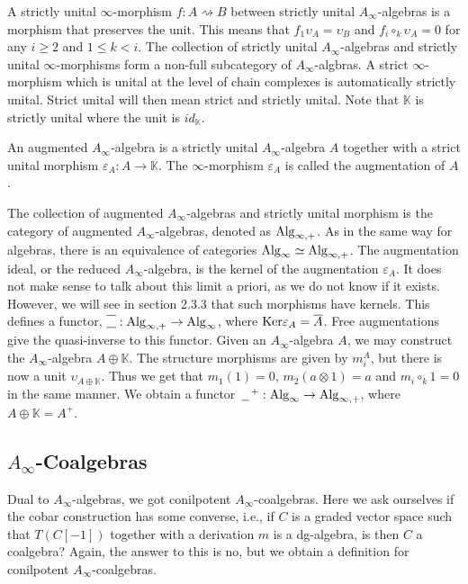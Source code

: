 \documentclass[../thesis.tex]{subfiles}
\begin{document}
        A strictly unital $\infty$-morphism $f: A \rightsquigarrow B$ between strictly unital $A_\infty$-algebras is a morphism that preserves the unit. This means that $f_1\upsilon_A = \upsilon_B$ and $f_i \circ_k \upsilon_A = 0$ for any $i \geq 2$ and $1 \leq k < i$. The collection of strictly unital $A_\infty$-algebras and strictly unital $\infty$-morphisms form a non-full subcategory of $A_\infty$-algbras. A strict $\infty$-morphism which is unital at the level of chain complexes is automatically strictly unital. Strict unital will then mean strict and strictly unital. Note that $\mathbb{K}$ is strictly unital where the unit is $id_\mathbb{K}$.

        \begin{definition}\label{def: augmented-sha}
            An augmented $A_\infty$-algebra is a strictly unital $A_\infty$-algebra $A$ together with a strict unital morphism $\varepsilon_A: A \rightarrow \mathbb{K}$. The $\infty$-morphism $\varepsilon_A$ is called the augmentation of $A$.
        \end{definition}

        The collection of augmented $A_\infty$-algebras and strictly unital morphism is the category of augmented $A_\infty$-algebras, denoted as $\tt{Alg}_{\infty,+}$. As in the same way for algebras, there is an equivalence of categories $\tt{Alg}_\infty \simeq \tt{Alg}_{\infty,+}$. The augmentation ideal, or the reduced $A_\infty$-algebra, is the kernel of the augmentation $\varepsilon_A$. It does not make sense to talk about this limit a priori, as we do not know if it exists. However, we will see in section 2.3.3 that such morphisms have kernels. This defines a functor, $\overline{\underline{\phantom{A}}} : \tt{Alg}_{\infty ,+} \rightarrow \tt{Alg}_\infty$, where $\tt{Ker}\varepsilon_A = \overline{A}$. Free augmentations give the quasi-inverse to this functor. Given an $A_\infty$-algebra $A$, we may construct the $A_\infty$-algebra $A\oplus \mathbb{K}$. The structure morphisms are given by $m_i^A$, but there is now a unit $\upsilon_{A\oplus\mathbb{K}}$. Thus we get that $m_1(1) = 0$, $m_2 (a\otimes 1) = a$ and $m_i \circ_k 1 = 0$ in the same manner. We obtain a functor $\argument^+ : \tt{Alg}_\infty \rightarrow \tt{Alg}_{\infty, +}$, where $A\oplus \mathbb{K} = A^+$.

    \subsection{$A_\infty$-Coalgebras}    
        Dual to $A_\infty$-algebras, we got conilpotent $A_\infty$-coalgebras. Here we ask ourselves if the cobar construction has some converse, i.e., if $C$ is a graded vector space such that $T(C[-1])$ together with a derivation $m$ is a dg-algebra, is then $C$ a coalgebra? Again, the answer to this is no, but we obtain a definition for conilpotent $A_\infty$-coalgebras.
\end{document}
